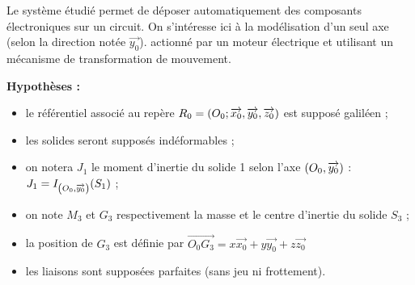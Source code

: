 \documentclass[10pt,fleqn]{article} %
\begin{document}
\def\pathfig{images}

\vspace{4.5cm}
\pagestyle{fancy}
\thispagestyle{plain}

\def\columnseprulecolor{\color{ocre}}
\setlength{\columnseprule}{0.4pt} 

\def\pathfig{images}

\ifprof
\begin{multicols}{2}
\else
\begin{multicols}{2}
\fi



Le système étudié permet de déposer automatiquement des composants électroniques sur un circuit.
On s'intéresse ici à la modélisation d'un seul axe (selon la direction notée $\overrightarrow{y_0}$). actionné par un moteur électrique et utilisant un mécanisme de transformation de mouvement.
%
%


\textbf{Hypothèses :}
\begin{itemize}
\item le référentiel associé au repère $R_0=\left(O_0;\overrightarrow{x_0},\overrightarrow{y_0},\overrightarrow{z_0} \right)$ est supposé galiléen ;
\item les solides seront supposés indéformables ; 
\item on notera $J_1$ le moment d'inertie du solide 1 selon l'axe $\left(O_0,\overrightarrow{y_0}\right)$ : $J_1=I_{\left(O_0,\overrightarrow{y_0}\right)}(S_1)$ ;
\item on note $M_3$ et $G_3$ respectivement la masse et le centre d'inertie du solide $S_3$ ;
\item la position de $G_3$ est définie par $\overrightarrow{O_0G_3}=x\overrightarrow{x_0}+y \overrightarrow{y_0}+z \overrightarrow{z_0}$
\item les liaisons sont supposées parfaites (sans jeu ni frottement).
\end{itemize}


\end{multicols}
\end{multicols}
\end{document}
